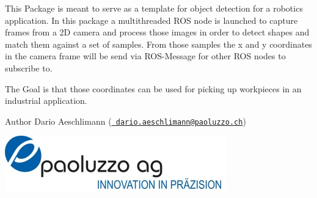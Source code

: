 This Package is meant to serve as a template for object detection for a robotics application. In this package a multithreaded R\+OS node is launched to capture frames from a 2D camera and process those images in order to detect shapes and match them against a set of samples. From those samples the x and y coordinates in the camera frame will be send via R\+O\+S-\/\+Message for other R\+OS nodes to subscribe to.

The Goal is that those coordinates can be used for picking up workpieces in an industrial application.

\begin{DoxyAuthor}{Author}
Dario Aeschlimann (\href{mailto:dario.aeschlimann@paoluzzo.ch}{\texttt{ dario.\+aeschlimann@paoluzzo.\+ch}})
\end{DoxyAuthor}
 
\begin{DoxyImage}
\includegraphics[width=\textwidth,height=\textheight/2,keepaspectratio=true]{Pao_Logo.jpg}
\end{DoxyImage}
   